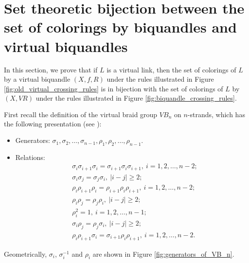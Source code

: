 \documentclass[11pt, reqno]{amsart}
\theoremstyle{definition}
\begin{document}



\section{Set theoretic bijection between the set of colorings by biquandles and virtual biquandles}\label{Col}
In this section, we prove that if $L$ is a virtual link, then the set of colorings of $L$ by a virtual biquandle $(X,f,R)$ under the rules illustrated in Figure \ref{fig:old_virtual_crossing_rules} is in bijection with the set of colorings of $L$ by $(X,VR)$ under the rules illustrated in Figure \ref{fig:biquandle_crossing_rules}.


First recall the definition of the virtual braid group $VB_n$ on $n$-strands, which has the following presentation (see \cite[Theorem 4]{MR2493369}):

\begin{itemize}
\item Generators: $\sigma_1, \sigma_2, \ldots, \sigma_{n-1},\rho_1, \rho_2, \ldots, \rho_{n-1}.$
\item Relations: 
\begin{align*}
&\sigma_i \sigma_{i+1} \sigma_i = \sigma_{i+1} \sigma_i \sigma_{i+1}, ~i=1,2,\ldots, n-2;\\
&\sigma_i \sigma_j = \sigma_j \sigma_i, ~|i-j| \geq 2;\\
&\rho_i\rho_{i+1} \rho_i = \rho_{i+1}\rho_i \rho_{i+1}, ~ i=1,2,\ldots,n-2;\\
&\rho_i \rho_j =\rho_j \rho_i,~ | i-j| \geq 2;\\
&\rho_i^2 =1,~ i=1,2,\ldots,n-1;\\
&\sigma_i \rho_j = \rho_j \sigma_i,~ |i-j| \geq 2;\\
&\rho_i \rho_{i+1} \sigma_i = \sigma_{i+1} \rho_i \rho_{i+1},~ i=1,2,\ldots, n-2.
\end{align*}
\end{itemize}
Geometrically, $\sigma_i$, $\sigma_i^{-1}$ and $\rho_i$ are shown in Figure \ref{fig:generators_of_VB_n}.
\end{document}
